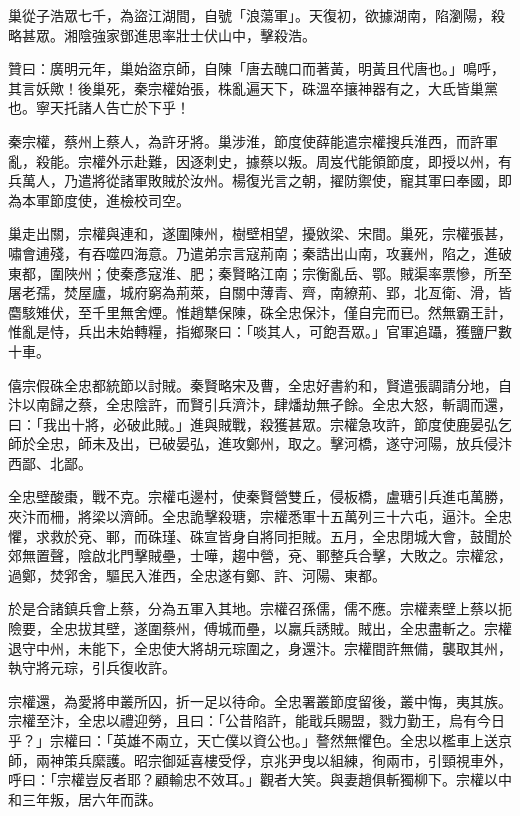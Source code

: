 \begin{pinyinscope}
 巢從子浩眾七千，為盜江湖間，自號「浪蕩軍」。天復初，欲據湖南，陷瀏陽，殺略甚眾。湘陰強家鄧進思率壯士伏山中，擊殺浩。



 贊曰：廣明元年，巢始盜京師，自陳「唐去醜口而著黃，明黃且代唐也。」鳴呼，其言妖歟！後巢死，秦宗權始張，株亂遍天下，硃溫卒攘神器有之，大氐皆巢黨也。寧天托諸人告亡於下乎！



 秦宗權，蔡州上蔡人，為許牙將。巢涉淮，節度使薛能遣宗權搜兵淮西，而許軍亂，殺能。宗權外示赴難，因逐刺史，據蔡以叛。周岌代能領節度，即授以州，有兵萬人，乃遣將從諸軍敗賊於汝州。楊復光言之朝，擢防禦使，寵其軍曰奉國，即為本軍節度使，進檢校司空。



 巢走出關，宗權與連和，遂圍陳州，樹壁相望，擾敓梁、宋間。巢死，宗權張甚，嘯會逋殘，有吞噬四海意。乃遣弟宗言寇荊南；秦誥出山南，攻襄州，陷之，進破東都，圍陜州；使秦彥寇淮、肥；秦賢略江南；宗衡亂岳、鄂。賊渠率票慘，所至屠老孺，焚屋廬，城府窮為荊萊，自關中薄青、齊，南繚荊、郢，北亙衛、滑，皆麕駭雉伏，至千里無舍煙。惟趙犨保陳，硃全忠保汴，僅自完而已。然無霸王計，惟亂是恃，兵出未始轉糧，指鄉聚曰：「啖其人，可飽吾眾。」官軍追躡，獲鹽尸數十車。



 僖宗假硃全忠都統節以討賊。秦賢略宋及曹，全忠好書約和，賢遣張調請分地，自汴以南歸之蔡，全忠陰許，而賢引兵濟汴，肆燔劫無孑餘。全忠大怒，斬調而還，曰：「我出十將，必破此賊。」進與賊戰，殺獲甚眾。宗權急攻許，節度使鹿晏弘乞師於全忠，師未及出，已破晏弘，進攻鄭州，取之。擊河橋，遂守河陽，放兵侵汴西鄙、北鄙。



 全忠壁酸棗，戰不克。宗權屯邊村，使秦賢營雙丘，侵板橋，盧瑭引兵進屯萬勝，夾汴而柵，將梁以濟師。全忠詭擊殺瑭，宗權悉軍十五萬列三十六屯，逼汴。全忠懼，求救於兗、鄆，而硃瑾、硃宣皆身自將同拒賊。五月，全忠閉城大會，鼓聞於郊無置聲，陰啟北門擊賊壘，士嘩，趨中營，兗、鄆整兵合擊，大敗之。宗權忿，過鄭，焚郛舍，驅民入淮西，全忠遂有鄭、許、河陽、東都。



 於是合諸鎮兵會上蔡，分為五軍入其地。宗權召孫儒，儒不應。宗權素壁上蔡以扼險要，全忠拔其壁，遂圍蔡州，傅城而壘，以羸兵誘賊。賊出，全忠盡斬之。宗權退守中州，未能下，全忠使大將胡元琮圍之，身還汴。宗權間許無備，襲取其州，執守將元琮，引兵復收許。



 宗權還，為愛將申叢所囚，折一足以待命。全忠署叢節度留後，叢中悔，夷其族。宗權至汴，全忠以禮迎勞，且曰：「公昔陷許，能戢兵賜盟，戮力勤王，烏有今日乎？」宗權曰：「英雄不兩立，天亡僕以資公也。」謷然無懼色。全忠以檻車上送京師，兩神策兵縻護。昭宗御延喜樓受俘，京兆尹曳以組練，徇兩市，引頸視車外，呼曰：「宗權豈反者耶？顧輸忠不效耳。」觀者大笑。與妻趙俱斬獨柳下。宗權以中和三年叛，居六年而誅。




\end{pinyinscope}
